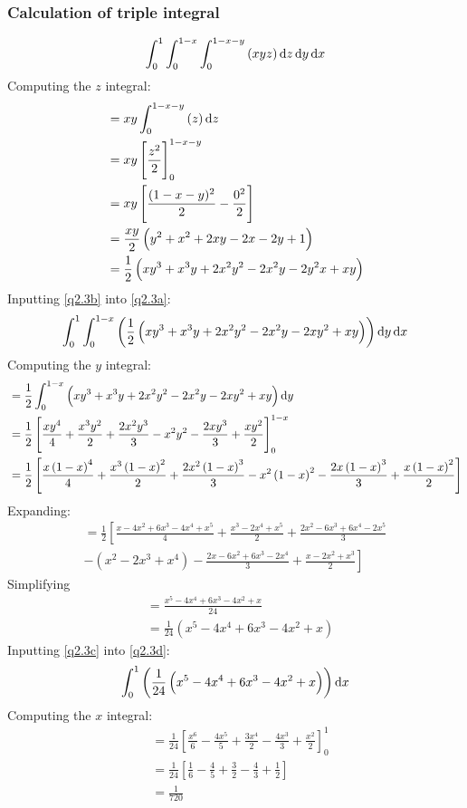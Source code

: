 \documentclass[11pt]{article}
\numberwithin{equation}{section}
\begin{document}
\subsubsection{Calculation of triple integral}
\begin{equation}
    \int_0^1 \int_0^{1-x} \int_0^{1-x-y} \left(xyz\right)\dif z \dif y \dif x \label{q2.3a}
\end{equation}
Computing the $z$ integral:
\begin{align}
    &= xy\int_0^{1-x-y} \left(z\right)\dif z\\
    &= xy \left[\frac{z^2}{2}\right]_0^{1-x-y}\\
    &= xy \left[\frac{(1-x-y)^2}{2}-\frac{0^2}{2}\right]\\
    &= \frac{xy}{2} \left(y^2 + x^2 + 2xy -2x -2y + 1\right)\\
    &= \frac{1}{2}\left(xy^3 + x^3y + 2x^2 y^2 -2x^2y - 2y^2x + xy\right) \label{q2.3b}
\end{align}
Inputting \ref{q2.3b} into \ref{q2.3a}:
\begin{align}
    \int_0^1 \int_0^{1-x} \left(\frac{1}{2}\left(xy^3 + x^3y + 2x^2 y^2 -2x^2y - 2xy^2 + xy\right) \right)\dif y \dif x \label{q2.3d}
\end{align}
Computing the $y$ integral:
\begin{align}
    &= \frac{1}{2} \int_0^{1-x}\left(xy^3 + x^3y + 2x^2 y^2 -2x^2y - 2xy^2 + xy\right) \dif y\\
    &= \frac{1}{2}\left[\frac{xy^4}{4} + \frac{x^3y^2}{2} + \frac{2x^2y^3}{3} -x^2y^2-\frac{2xy^3}{3}+ \frac{xy^2}{2}\right]_0^{1-x}\\
    &= \frac{1}{2}\left[\frac{x\left(1-x\right)^4}{4} + \frac{x^3\left(1-x\right)^2}{2} + \frac{2x^2\left(1-x\right)^3}{3} -x^2\left(1-x\right)^2-\frac{2x\left(1-x\right)^3}{3}+ \frac{x\left(1-x\right)^2}{2}\right]
\end{align}
Expanding:
\begin{multline}
    = \frac{1}{2}\left[\frac{x - 4x^2 + 6x^3 - 4x^4 + x^5}{4} \right.+ \frac{x^3 - 2x^4 + x^5}{2} + \frac{2x^2-6x^3 + 6x^4 -2x^5}{3}\\ \left. -\left(x^2-2x^3+x^4\right)-\frac{2x-6x^2 +6x^3 -2x^4}{3}+ \frac{x-2x^2 + x^3}{2}\right]
\end{multline}
Simplifying
\begin{align}
    &= \frac{x^5 -4x^4 + 6x^3 -4x^2 + x}{24}\\
    &= \frac{1}{24}\left(x^5 -4x^4 +6x^3 -4x^2 + x\right) \label{q2.3c}
\end{align}
Inputting \ref{q2.3c} into \ref{q2.3d}:
\begin{equation}
    \int_0^1 \left( \frac{1}{24}\left(x^5 -4x^4 +6x^3 -4x^2 + x\right) \right)\dif x 
\end{equation}
Computing the $x$ integral:
\begin{align}
    &= \frac{1}{24}\left[\frac{x^6}{6}-\frac{4x^5}{5}+\frac{3x^4}{2}-\frac{4x^3}{3} + \frac{x^2}{2}\right]_0^1\\
    &= \frac{1}{24}\left[\frac{1}{6} - \frac{4}{5} + \frac{3}{2} - \frac{4}{3} + \frac{1}{2}\right]\\
    &= \frac{1}{720}
\end{align}
\end{document}
